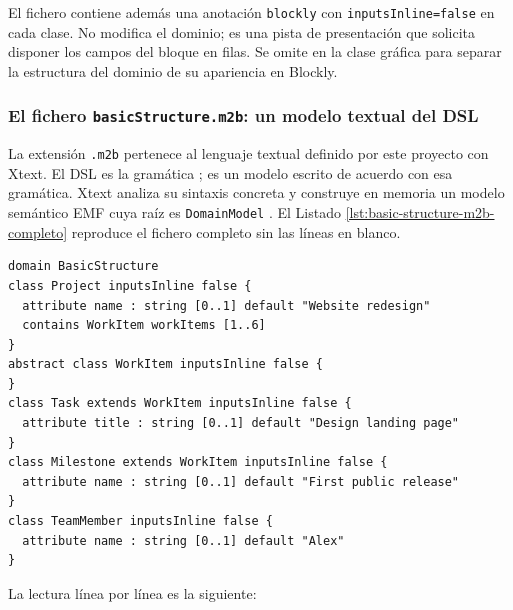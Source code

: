 El fichero contiene además una anotación \texttt{blockly} con
\texttt{inputsInline=false} en cada clase. No modifica el dominio; es una pista
de presentación que solicita disponer los campos del bloque en filas. Se omite
en la clase gráfica para separar la estructura del dominio de su apariencia en
Blockly.

\subsubsection{El fichero \texttt{basicStructure.m2b}: un modelo textual del DSL}

La extensión \texttt{.m2b} pertenece al lenguaje textual definido por este
proyecto con Xtext. El DSL es la gramática
;  es un modelo escrito de
acuerdo con esa gramática. Xtext analiza su sintaxis concreta y construye en
memoria un modelo semántico EMF cuya raíz es \texttt{DomainModel}
\cite{xtextProject,xtextGrammarLanguage}. El Listado
\ref{lst:basic-structure-m2b-completo} reproduce el fichero completo sin las
líneas en blanco.

\begin{lstlisting}[float=htbp, style=tfmm2b, caption={Contenido completo de \texttt{basicStructure.m2b}}, label={lst:basic-structure-m2b-completo}]
domain BasicStructure
class Project inputsInline false {
  attribute name : string [0..1] default "Website redesign"
  contains WorkItem workItems [1..6]
}
abstract class WorkItem inputsInline false {
}
class Task extends WorkItem inputsInline false {
  attribute title : string [0..1] default "Design landing page"
}
class Milestone extends WorkItem inputsInline false {
  attribute name : string [0..1] default "First public release"
}
class TeamMember inputsInline false {
  attribute name : string [0..1] default "Alex"
}
\end{lstlisting}

La lectura línea por línea es la siguiente:

